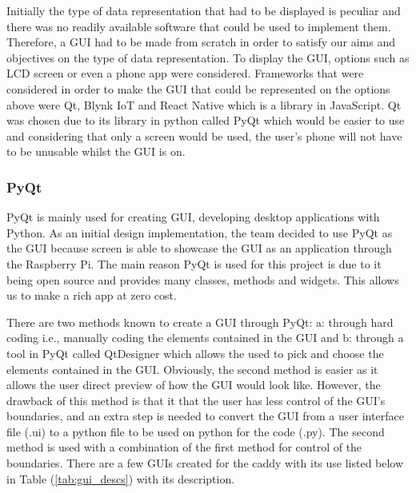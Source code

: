 \documentclass[11pt,landscape]{article}
\begin{document}
\begin{multicols}{3}
Initially the type of data representation that had to be displayed is peculiar
and there was no readily available software that could be used to implement
them. Therefore, a GUI had to be made from scratch in order to satisfy our aims
and objectives on the type of data representation. To display the GUI, options
such as LCD screen or even a phone app were considered. Frameworks that were
considered in order to make the GUI that could be represented on the options
above were Qt, Blynk IoT and React Native which is a library in JavaScript. Qt
was chosen due to its library in python called PyQt which would be easier to use
and considering that only a screen would be used, the user’s phone will not have
to be unusable whilst the GUI is on. 

\subsubsection{PyQt}
PyQt is mainly used for creating GUI, developing desktop applications with
Python. As an initial design implementation, the team decided to use PyQt as the
GUI because screen is able to showcase the GUI as an application through the
Raspberry Pi. The main reason PyQt is used for this project is due to it being
open source and provides many classes, methods and widgets. This allows us to
make a rich app at zero cost.  

There are two methods known to create a GUI through PyQt: a: through hard coding
i.e., manually coding the elements contained in the GUI and b: through a tool in
PyQt called QtDesigner which allows the used to pick and choose the elements
contained in the GUI. Obviously, the second method is easier as it allows the
user direct preview of how the GUI would look like. However, the drawback of
this method is that it that the user has less control of the GUI’s boundaries,
and an extra step is needed to convert the GUI from a user interface file (.ui)
to a python file to be used on python for the code (.py). The second method is
used with a combination of the first method for control of the boundaries. There
are a few GUIs created for the caddy with its use listed below in Table
(\ref{tab:gui_descs}) with its description.


\end{multicols}
\end{document}
